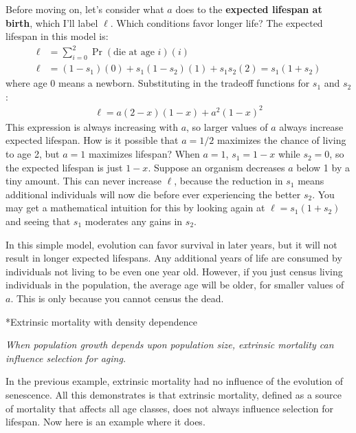 \documentclass[10pt,reqno]{amsbook}
\makeatletter
\newcommand{\bemph}[1]{{\textbf{\textcolor{bemphcol}{#1}}}}
\renewcommand\section{\@startsection{section}{1}
\z@{.7\linespacing\@plus\linespacing}{.5\linespacing}
{\large\bfseries\itshape}}
\numberwithin{equation}{chapter}
\newenvironment{precis}
{\noi\itshape}
{\vspace{6pt}}
\newcommand{\noi}{\noindent}
\makeatother
\begin{document}
Before moving on, let's consider what $a$ does to the \bemph{expected lifespan at birth}, which I'll label $\ell$. Which conditions favor longer life? The expected lifespan in this model is:
\begin{align*}
	\ell &= \sum_{i=0}^2 \Pr(\text{die at age~}i)(i) \\
	\ell & = (1-s_1)(0) +  s_1 (1-s_2) (1) +  s_1 s_2 (2) = s_1( 1 + s_2 )
\end{align*}
where age 0 means a newborn. Substituting in the tradeoff functions for $s_1$ and $s_2$:
\begin{align*}
	\ell = a (2 - x) (1 - x) + a^2 (1 - x)^2
\end{align*}
This expression is always increasing with $a$, so larger values of $a$ always increase expected lifespan. How is it possible that $a=1/2$ maximizes the chance of living to age 2, but $a=1$ maximizes lifespan? When $a=1$, $s_1=1-x$ while $s_2=0$, so the expected lifespan is just $1-x$. Suppose an organism decreases $a$ below 1 by a tiny amount. %
This can never increase $\ell$, because the reduction in $s_1$ means additional individuals will now die before ever experiencing the better $s_2$. You may get a mathematical intuition for this by looking again at $\ell=s_1(1+s_2)$ and seeing that $s_1$ moderates any gains in $s_2$.

In this simple model, evolution can favor survival in later years, but it will not result in longer expected lifespans. Any additional years of life are consumed by individuals not living to be even one year old. However, if you just census living individuals in the population, the average age will be older, for smaller values of $a$. This is only because you cannot census the dead.


\section*{Extrinsic mortality with density dependence}

\begin{precis}
When population growth depends upon population size, extrinsic mortality can influence selection for aging.
\end{precis}

In the previous example, extrinsic mortality had no influence of the evolution of senescence. All this demonstrates is that extrinsic mortality, defined as a source of mortality that affects all age classes, does not always influence selection for lifespan. Now here is an example where it does. 
\end{document}
